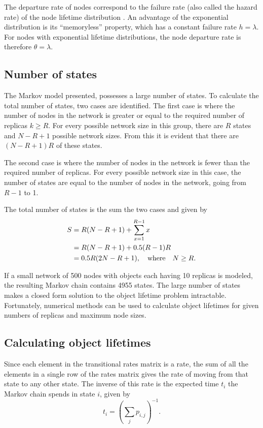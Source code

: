 The departure rate of nodes correspond to the failure rate (also called the hazard rate) of the node lifetime distribution \cite{rausand2004systemreliability}. An advantage of the exponential distribution is its ``memoryless'' property, which has a constant failure rate $h = \lambda$. For nodes with exponential lifetime distributions, the node departure rate is therefore $\theta = \lambda$.

\subsection{Number of states}

The Markov model presented, possesses a large number of states. To calculate the total number of states, two cases are identified. The first case is where the number of nodes in the network is greater or equal to the required number of replicas $k \geq R$. For every possible network size in this group, there are $R$ states and $N - R + 1$ possible network sizes. From this it is evident that there are $(N - R + 1)R$ of these states.

The second case is where the number of nodes in the network is fewer than the required number of replicas. For every possible network size in this case, the number of states are equal to the number of nodes in the network, going from $R-1$ to 1.

The total number of states is the sum the two cases and given by
%
\begin{align}
       S & = R(N - R + 1) + \sum_{x=1}^{R-1} x\label{eq_states_num_init}\\
         & = R(N - R + 1) + 0.5 (R - 1) R\notag\\
         & = 0.5 R (2 N - R + 1), \quad\textrm{where}\quad N \geq R. \label{eq_states_num_ans}
\end{align}

If a small network of 500 nodes with objects each having 10 replicas is modeled, the resulting Markov chain contains 4955 states. The large number of states makes a closed form solution to the object lifetime problem intractable. Fortunately, numerical methods can be used to calculate object lifetimes for given numbers of replicas and maximum node sizes.

\subsection{Calculating object lifetimes}

Since each element in the transitional rates matrix is a rate, the sum of all the elements in a single row of the rates matrix gives the rate of moving from that state to any other state. The inverse of this rate is the expected time $t_i$ the Markov chain spends in state $i$, given by
%
\begin{equation} \label{eq_markov_rates}
    t_i = \left(\sum_{j} p_{i, j}\right)^{-1}.
\end{equation}

